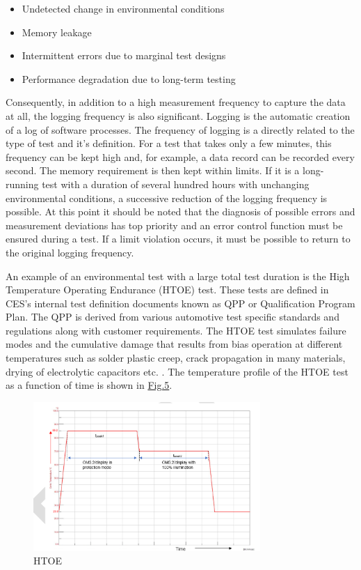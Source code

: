 \begin{itemize}
    \item Undetected change in environmental conditions
    \item Memory leakage
    \item Intermittent errors due to marginal test designs
    \item Performance degradation due to long-term testing
\end{itemize}

Consequently, in addition to a high measurement frequency to capture the data at all, the logging frequency is also significant. Logging is the automatic creation of a log of software processes. The frequency of logging is a directly related to the type of test and it's definition. For a test that takes only a few minutes, this frequency can be kept high and, for example, a data record can be recorded every second. The memory requirement is then kept within limits. If it is a long-running test with a duration of several hundred hours with unchanging environmental conditions, a successive reduction of the logging frequency is possible. At this point it should be noted that the diagnosis of possible errors and measurement deviations has top priority and an error control function must be ensured during a test. If a limit violation occurs, it must be possible to return to the original logging frequency.


An example of an environmental test with a large total test duration is the High Temperature Operating Endurance (HTOE) test. These tests are defined in CES's internal test definition documents known as QPP or Qualification Program Plan. The QPP is derived from various automotive test specific standards and regulations along with customer requirements. The HTOE test simulates failure modes and the cumulative damage that results from bias operation at different temperatures such as solder plastic creep, crack propagation in many materials, drying of electrolytic capacitors etc. \cite{qpp}. The temperature profile of the HTOE test as a function of time is shown in \hyperref[fig:HTOE Test Cycle]{Fig.5}. 

\begin{figure}[H]
	\centering
	\includegraphics[width= 0.77\textwidth]{images/HTOE.png}
	\caption{HTOE}  
	\label{fig:HTOE Test Cycle}
\end{figure}

